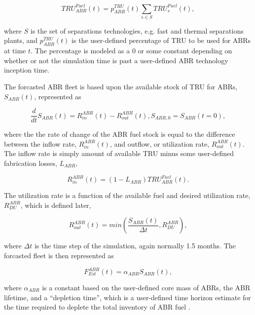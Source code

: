 \begin{equation*}
 TRU^{Fuel}_{ABR}(t) = p^{TRU}_{ABR}(t) \sum_{s \in S} TRU^{Fuel}_s(t),
\end{equation*}

where $S$ is the set of separations technologies, e.g. fast and thermal
separations plants, and $p^{TRU}_{ABR}(t)$ is the user-defined percentage of TRU
to be used for ABRs at time $t$. The percentage is modeled as a 0 or some
constant depending on whether or not the simulation time is past a user-defined
ABR technology inception time. 

The forcasted ABR fleet is based upon the available stock of TRU for ABRs,
$S_{ABR}(t)$, represented as

\begin{equation*}
 \frac{d}{dt}S_{ABR}(t) = R_{in}^{ABR}(t) - R_{out}^{ABR}(t), S_{ABR,0} = S_{ABR}(t=0),
\end{equation*}

where the the rate of change of the ABR fuel stock is equal to the difference
between the inflow rate, $R_{in}^{ABR}(t)$, and outflow, or utilization rate,
$R_{out}^{ABR}(t)$. The inflow rate is simply amount of available TRU minus some
user-defined fabrication losses, $L_{ABR}$,

\begin{equation*}
 R_{in}^{ABR}(t) = \left( 1 - L_{ABR} \right) TRU^{Fuel}_{ABR}(t).
\end{equation*}

The utilization rate is a function of the available fuel and desired utilization
rate, $R^{ABR}_{DU}$, which is defined later,

\begin{equation*}
 R_{out}^{ABR}(t) = min \left( \frac{S_{ABR}(t)}{\Delta t}, R^{ABR}_{DU}\right),
\end{equation*}

where $\Delta t$ is the time step of the simulation, again normally 1.5
months. The forcasted fleet is then represented as

\begin{equation*}
 F_{Est}^{ABR}(t) = \alpha_{ABR} S_{ABR}(t),
\end{equation*}

where $\alpha_{ABR}$ is a constant based on the user-defined core mass of ABRs,
the ABR lifetime, and a ``depletion time'', which is a user-defined time horizon
estimate for the time required to deplete the total inventory of ABR
fuel \cite{busquim_e_silva_system_2008}.


